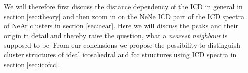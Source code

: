We will
therefore first discuss the distance dependency of the ICD in general
in section \ref{sec:theory} and then
zoom in on the NeNe ICD part of the ICD spectra of NeAr clusters
\cite{Fasshauer14_1} in section \ref{sec:near}. Here we will discuss the
peaks and their origin in detail and thereby
raise the question, what a \emph{nearest neighbour} is supposed to be. From
our conclusions we propose the possibility to distinguish cluster structures
of ideal icosahedral and fcc structures using ICD spectra in
section \ref{sec:icofcc}.

